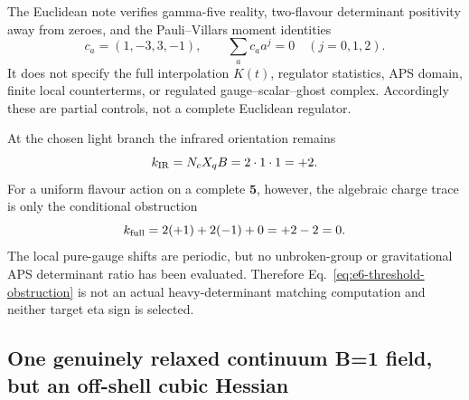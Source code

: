 \documentclass[11pt]{article}
\numberwithin{equation}{section}
\begin{document}
The Euclidean note verifies gamma-five reality, two-flavour determinant
positivity away from zeroes, and the Pauli--Villars moment identities
\begin{equation}
 c_a=(1,-3,3,-1),\qquad
 \sum_a c_a a^j=0\quad(j=0,1,2).
 \label{eq:e6-pv-moments}
\end{equation}
It does not specify the full interpolation \(K(t)\), regulator statistics,
APS domain, finite local counterterms, or regulated gauge--scalar--ghost
complex.  Accordingly these are partial controls, not a complete Euclidean
regulator.

At the chosen light branch the infrared orientation remains
\begin{equation}
 k_{\rm IR}=N_cX_qB=2\cdot1\cdot1=+2.
 \label{eq:e6-ir-orientation}
\end{equation}
For a uniform flavour action on a complete \(\bm5\), however, the algebraic
charge trace is only the conditional obstruction
\begin{equation}
 k_{\rm full}=2(+1)+2(-1)+0=+2-2=0.
 \label{eq:e6-threshold-obstruction}
\end{equation}
The local pure-gauge shifts are periodic, but no unbroken-group or
gravitational APS determinant ratio has been evaluated.  Therefore
Eq.~\eqref{eq:e6-threshold-obstruction} is not an actual heavy-determinant
matching computation and neither target eta sign is selected.

\subsection{One genuinely relaxed continuum B=1 field, but an off-shell
cubic Hessian}
\end{document}
